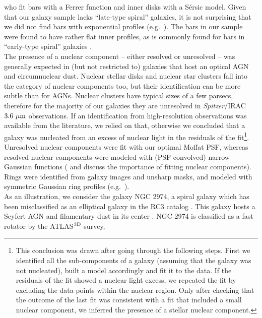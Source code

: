 \documentclass[preprint2]{emulateapj}
\begin{document}
who fit bars with a Ferrer function and inner disks with a S\'ersic model. 
Given that our galaxy sample lacks ``late-type spiral'' galaxies, 
it is not surprising \citep{gadottidesouza2006} that we did not find bars with exponential profiles 
(e.g.~\citealt{elmegreenelmegreen1985,gadotti2008,kim2015}).
The bars in our sample were found to have rather flat inner profiles, 
as is commonly found for bars in ``early-type spiral'' galaxies \citep{gadottidesouza2006}.  \\
The presence of a nuclear component -- either resolved or unresolved -- was generally expected in 
(but not restricted to) galaxies that host an optical AGN and circumnuclear dust.
Nuclear stellar disks and nuclear star clusters fall into the category of nuclear components too,
but their identification can be more subtle than for AGNs.
Nuclear clusters have typical sizes of a few parsecs, 
therefore for the majority of our galaxies they are unresolved in \emph{Spitzer}/IRAC $3.6~\rm \mu m$ observations.
If an identification from high-resolution observations was available from the literature, we relied on that, 
otherwise we concluded that a galaxy was nucleated from an excess of nuclear light in the residuals of the 
fit\footnote{This conclusion was drawn after going through the following steps. 
First we identified all the sub-components of a galaxy 
(assuming that the galaxy was not nucleated), built a model accordingly and fit it to the data.
If the residuals of the fit showed a nuclear light excess, 
we repeated the fit by excluding the data points within the nuclear region.
Only after checking that the outcome of the last fit was consistent with a fit that included a small nuclear component, 
we inferred the presence of a stellar nuclear component.}.
Unresolved nuclear components were fit with our optimal Moffat PSF,
whereas resolved nuclear components were modeled with (PSF-convolved) narrow Gaussian functions 
(\citealt{wadadekar1999,ravindranath2001,peng2002} and \citealt{gadotti2008} discuss the importance of fitting nuclear components). \\
Rings were identified from galaxy images and unsharp masks, and modeled with symmetric Gaussian ring profiles 
(e.g.~\citealt{sheth2010,kim2014}). \\
As an illustration, we consider the galaxy NGC 2974, 
a spiral galaxy which has been misclassified as an elliptical galaxy in the RC3 catalog \citep{RC3}. 
This galaxy hosts a Seyfert AGN \citep{veroncettyveron2006} and filamentary dust in its center \citep{tran2001}.
NGC 2974 is classified as a fast rotator by the ATLAS$^{\rm 3D}$ survey, 
\end{document}

